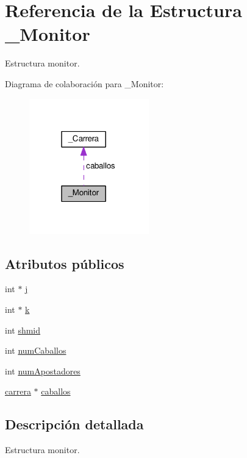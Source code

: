 \hypertarget{struct__Monitor}{}\section{Referencia de la Estructura \+\_\+\+Monitor}
\label{struct__Monitor}


Estructura monitor.  




Diagrama de colaboración para \+\_\+\+Monitor\+:\nopagebreak
\begin{figure}[H]
\begin{center}
\leavevmode
\includegraphics[width=147pt]{struct__Monitor__coll__graph}
\end{center}
\end{figure}
\subsection*{Atributos públicos}
\begin{DoxyCompactItemize}
\item 
int $\ast$ \hyperlink{struct__Monitor_a8c99fc7fcd474a35e14047b2d46af390}{j}
\item 
int $\ast$ \hyperlink{struct__Monitor_ae06ed31d1e98a347e8147b713551fa26}{k}
\item 
int \hyperlink{struct__Monitor_aa927c580f30b2085647032599b6dde4c}{shmid}
\item 
int \hyperlink{struct__Monitor_a5a1c304eaa4f2cca52dc2d5ac937894e}{num\+Caballos}
\item 
int \hyperlink{struct__Monitor_a54944b0b93b7d647fed1a5225e02d40a}{num\+Apostadores}
\item 
\hyperlink{carrera_8c_a33c95e52916a47e1884db1151b066166}{carrera} $\ast$ \hyperlink{struct__Monitor_a4c856b284d47e65fddfa0b3898895489}{caballos}
\end{DoxyCompactItemize}


\subsection{Descripción detallada}
Estructura monitor. 

